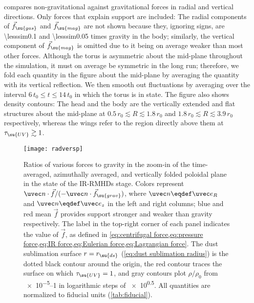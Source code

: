 \documentclass[twocolumn]{article}
\makeatletter
\let\ifaastex\@secondoftwo
\newcommand*\irrmhd{\ac{IR}\protect\nobreakdash-\acp{RMHD}}
\makeatother
\begin{document}
 compares non-gravitational against gravitational forces in
radial and vertical directions. Only forces that explain support are included:
The radial components of $\vec f_\su{gas}$ and $\vec f_\su{mag}$ are not shown
because they, ignoring signs, are \num{\lesssim0.1} and \num{\lesssim0.05}
times gravity in the body; similarly, the vertical component of $\vec
f_\su{mag}$ is omitted due to it being on average weaker than most other
forces. Although the torus is asymmetric about the mid-plane throughout the
simulation, it must on average be symmetric in the long run; therefore, we fold
each quantity in the figure about the mid-plane by averaging the quantity with
its vertical reflection. We then smooth out fluctuations by averaging over the
interval $6\,t_0\le t\le 14\,t_0$ in which the torus is in 
state. The figure also shows density contours: The head and the body are the
vertically extended and flat structures about the mid-plane at
$0.5\,r_0\lesssim R\lesssim1.8\,r_0$ and $1.8\,r_0\lesssim R\lesssim3.9\,r_0$
respectively, whereas the wings refer to the region directly above them at
$\tau_\su{UV}\gtrsim1$.

\begin{figure*}
\ifaastex{\vskip-13.5ex}\relax
\texttt{[image: radversp]}
\caption{Ratios of various forces to gravity in the zoom-in of the
time-averaged, azimuthally averaged, and vertically folded poloidal plane in
the  state of the \irrmhd{} stage. Colors represent $\uvec
n\cdot\vec f/(-\uvec n\cdot\vec f_\su{grav})$, where $\uvec n\eqdef\uvec e_R$
and $\uvec n\eqdef\uvec e_z$ in the left and right columns; blue and red mean
$\vec f$ provides support stronger and weaker than gravity respectively. The
label in the top-right corner of each panel indicates the value of $\vec f$, as
defined in \cref{eq:centrifugal force,eq:pressure force,eq:IR force,eq:Eulerian
force,eq:Lagrangian force}. The dust sublimation surface $r=r_\su{ds}$
(\cref{eq:dust sublimation radius}) is the dotted black contour around the
origin, the red contour traces the surface on which $\tau_\su{UV}=1$, and gray
contours plot $\rho/\rho_0$ from \numrange{e-5}{1} in logarithmic steps of
\num{e0.5}. All quantities are normalized to fiducial units
(\cref{tab:fiducial}).}
\label{fig:support}
\end{figure*}
\end{document}
